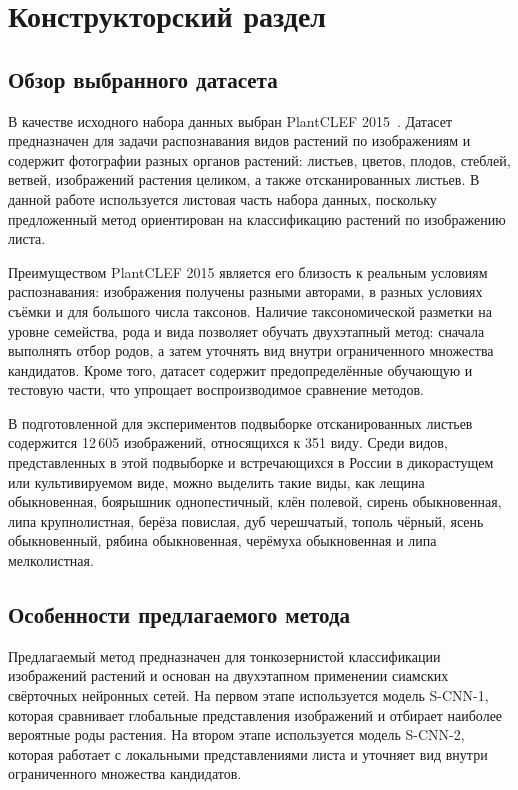 \chapter{Конструкторский раздел}

\section{Обзор выбранного датасета}
В качестве исходного набора данных выбран PlantCLEF 2015~\cite{ref1100}. Датасет предназначен для задачи распознавания видов растений по изображениям и содержит фотографии разных органов растений: листьев, цветов, плодов, стеблей, ветвей, изображений растения целиком, а также отсканированных листьев. В данной работе используется листовая часть набора данных, поскольку предложенный метод ориентирован на классификацию растений по изображению листа.

Преимуществом PlantCLEF 2015 является его близость к реальным условиям распознавания: изображения получены разными авторами, в разных условиях съёмки и для большого числа таксонов. Наличие таксономической разметки на уровне семейства, рода и вида позволяет обучать двухэтапный метод: сначала выполнять отбор родов, а затем уточнять вид внутри ограниченного множества кандидатов. Кроме того, датасет содержит предопределённые обучающую и тестовую части, что упрощает воспроизводимое сравнение методов.

В подготовленной для экспериментов подвыборке отсканированных листьев содержится 12\,605 изображений, относящихся к 351 виду. Среди видов, представленных в этой подвыборке и встречающихся в России в дикорастущем или культивируемом виде, можно выделить такие виды, как лещина обыкновенная, боярышник однопестичный, клён полевой, сирень обыкновенная, липа крупнолистная, берёза повислая, дуб черешчатый, тополь чёрный, ясень обыкновенный, рябина обыкновенная, черёмуха обыкновенная и липа мелколистная.

\section{Особенности предлагаемого метода}
Предлагаемый метод предназначен для тонкозернистой классификации изображений растений и основан на двухэтапном применении сиамских свёрточных нейронных сетей. На первом этапе используется модель S-CNN-1, которая сравнивает глобальные представления изображений и отбирает наиболее вероятные роды растения. На втором этапе используется модель S-CNN-2, которая работает с локальными представлениями листа и уточняет вид внутри ограниченного множества кандидатов.

